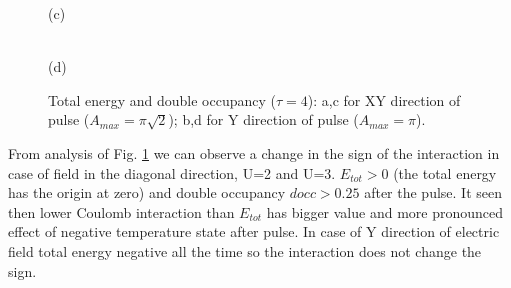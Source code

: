 \begin{figure}[h!]
\begin{minipage}[h]{0.5\linewidth}
 (c) \\
\end{minipage}
\hfill
\begin{minipage}[h]{0.5\linewidth}
 \\(d)
\end{minipage}

\caption{Total energy and double occupancy ($\tau = 4$): a,c for XY direction of pulse ($A_{max} =\pi\sqrt{2}$); b,d for Y direction of pulse ($A_{max} = \pi$).}
\label{fig:E_tot}
\end{figure}

From analysis of Fig. \ref{fig:E_tot} we can observe a change in the sign of the interaction in case of field in the diagonal direction, U=2 and U=3. $E_{tot}>0$ (the total energy has the origin at zero) and double occupancy $docc>0.25$ after the pulse. It seen then lower Coulomb interaction than $E_{tot}$ has bigger value and more pronounced effect of negative temperature state after pulse. In case of Y direction of electric field total energy negative all the time so the interaction does not change the sign. 


